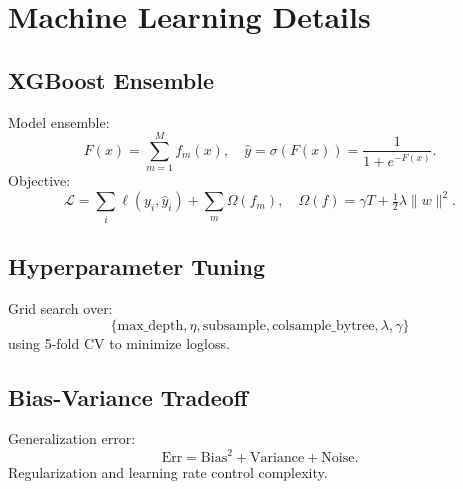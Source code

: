 \section{Machine Learning Details}

\subsection{XGBoost Ensemble}
Model ensemble:
\[
F(x) = \sum_{m=1}^M f_m(x),\quad
\hat{y} = \sigma(F(x)) = \frac{1}{1 + e^{-F(x)}}.
\]
Objective:
\[
\mathcal{L} = \sum_i \ell(y_i,\hat{y}_i) + \sum_{m}\Omega(f_m),
\quad
\Omega(f) = \gamma T + \tfrac12\lambda\lVert w\rVert^2.
\]

\subsection{Hyperparameter Tuning}
Grid search over:
\[
\{\text{max\_depth}, \eta, \text{subsample}, \text{colsample\_bytree}, \lambda, \gamma\}
\]
using 5-fold CV to minimize logloss.

\subsection{Bias-Variance Tradeoff}
Generalization error:
\[
\mathrm{Err} = \mathrm{Bias}^2 + \mathrm{Variance} + \text{Noise}.
\]
Regularization and learning rate control complexity.
